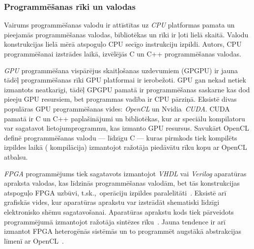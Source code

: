 \subsubsection*{Programmēšanas rīki un valodas}
Vairums programmēšanas valodu ir attīstītas uz \emph{CPU} platformas pamata un
pieejamās programmēšanas valodas, bibliotēkas un rīki ir ļoti lielā
skaitā. Valodu konstrukcijas lielā mērā atspoguļo CPU secīgo instrukciju
izpildi. Autors, CPU programmēšanai izstrādes laikā, izvēlējās C un C++
programmēšanas valodas.

\emph{GPU} programmēšana vispārējus skaitļošanas uzdevumiem (GPGPU) ir jauna
tādēļ programmēšanas rīki GPU platformai ir ierobežoti. GPU gan nekad netiek
izmantots neatkarīgi, tādēļ GPGPU pamatā ir programmēšanas saskarne
kas dod pieeju GPU resursiem, bet programmas vadība ir CPU pārziņā.
Eksistē divas populāras GPU programmēšanas vides: \emph{OpenCL} un
Nvidia~\emph{CUDA}. CUDA pamatā ir C un C++ paplašinājumi un bibliotēkas,
kur ar speciālu kompilatoru var sagatavot lietojumprogrammu, kas izmanto
GPU resursus. Savukārt OpenCL definē programmēšanas valodu --- līdzīgu C ---
kuras pirmkods tiek kompilēts izpildes laikā ( kompilācija)
izmantojot ražotāja piedāvātu rīku kopu ar OpenCL atbalsu.
\cite{Fatahalian}\cite{Owens-GPU}\cite{OpenCL-book}\cite{CUDA}

\emph{FPGA} programmējums tiek sagatavots izmantojot \emph{VHDL} vai
\emph{Verilog} aparatūras apraksta valodas, kas līdzinās programmēšanas
valodām, bet tās konstrukcijas atspoguļo FPGA uzbūvi, t.sk.,~operāciju
izpildes paralelitāti~\cite{JIS}.
Eksistē arī grafiskās vides, kur aparatūras aprakstu
var izstrādāt shematiski līdzīgi elektronisko shēmu sagatavošanai.
Aparatūras aprakstu kods tiek pārveidots programmējumā izmantojot
ražotāja sintēzes rīku~\cite{JIS}. Jauna tendence ir arī izmantot FPGA
heterogēnās sistēmās un to programmēt augstākā abstrakcijas līmenī ar
OpenCL~\cite{FPGA-ocl}.
